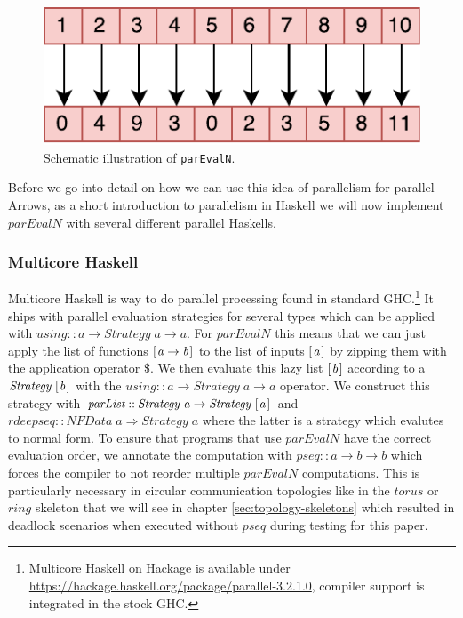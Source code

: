 \documentclass{jfp1}
\newcommand{\Conid}[1]{\mathit{#1}}
\newcommand{\Varid}[1]{\mathit{#1}}
\renewcommand{\cite}[1]{\citep{#1}}
\begin{document}
\begin{figure}[h]
  \centering
	\includegraphics[scale=0.7]{images/parEvalN}
	\caption{Schematic illustration of \texttt{parEvalN}.}
	\label{fig:parEvalN}
\end{figure}

Before we go into detail on how we can use this idea of parallelism for parallel Arrows, as a short introduction to parallelism in Haskell we will now implement \ensuremath{\Varid{parEvalN}} with several different parallel Haskells.

\subsubsection{Multicore Haskell}
Multicore Haskell \cite{Marlow2009,Trinder1999} is way to do parallel processing found in standard GHC.\footnote{Multicore Haskell on Hackage is available under \url{https://hackage.haskell.org/package/parallel-3.2.1.0}, compiler support is integrated in the stock GHC.} It ships with parallel evaluation strategies \cite{Trinder1998a,Marlow2010} for several types which can be applied with \ensuremath{\Varid{using}\mathbin{::}\Varid{a}\to \Conid{Strategy}\;\Varid{a}\to \Varid{a}}. For \ensuremath{\Varid{parEvalN}} this means that we can just apply the list of functions \ensuremath{[\mskip1.5mu \Varid{a}\to \Varid{b}\mskip1.5mu]} to the list of inputs \ensuremath{[\mskip1.5mu \Varid{a}\mskip1.5mu]} by zipping them with the application operator \ensuremath{\mathbin{\$}}. %
We then evaluate this lazy list \ensuremath{[\mskip1.5mu \Varid{b}\mskip1.5mu]} according to a \ensuremath{\Conid{Strategy}\;[\mskip1.5mu \Varid{b}\mskip1.5mu]} with the \ensuremath{\Varid{using}\mathbin{::}\Varid{a}\to \Conid{Strategy}\;\Varid{a}\to \Varid{a}} operator. We construct this strategy with \ensuremath{\Varid{parList}\mathbin{::}\Conid{Strategy}\;\Varid{a}\to \Conid{Strategy}\;[\mskip1.5mu \Varid{a}\mskip1.5mu]} and \ensuremath{\Varid{rdeepseq}\mathbin{::}\Conid{NFData}\;\Varid{a}\Rightarrow \Conid{Strategy}\;\Varid{a}} where the latter is a strategy which evalutes to normal form. To ensure that programs that use \ensuremath{\Varid{parEvalN}} have the correct evaluation order, we annotate the computation with \ensuremath{\Varid{pseq}\mathbin{::}\Varid{a}\to \Varid{b}\to \Varid{b}} which forces the compiler to not reorder multiple \ensuremath{\Varid{parEvalN}} computations. This is particularly necessary in circular communication topologies like in the \ensuremath{\Varid{torus}} or \ensuremath{\Varid{ring}} skeleton that we will see in chapter \ref{sec:topology-skeletons} which resulted in deadlock scenarios when executed without \ensuremath{\Varid{pseq}} during testing for this paper.
\end{document}
